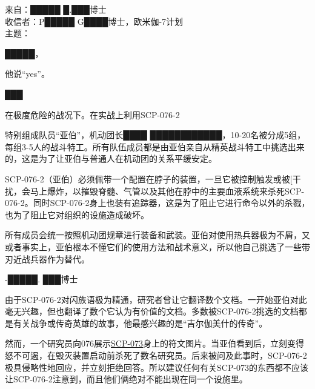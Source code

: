 \hr

\begin{scpbox}

来自：█████ █.███博士\\
收信者：P█████ G████博士，欧米伽-7计划\\
主题：

█████，

他说“yes”。

███

\end{scpbox}

\hr


\begin{scpbox}

在极度危险的战况下。在实战上利用SCP-076-2

特别组成队员“亚伯”，机动团长████ ████████████，10-20名被分成5组，每组3-5人的战斗特工。所有队伍成员都是由亚伯亲自从精英战斗特工中挑选出来的，这是为了让亚伯与普通人在机动团的关系平缓安定。

SCP-076-2（亚伯）必须佩带一个配置在脖子的装置，一旦它被控制触发或被{[}干扰，会马上爆炸，以摧毁脊髓、气管以及其他在脖中的主要血液系统来杀死SCP-076-2。同时SCP-076-2身上也装有追踪器，这是为了阻止它进行命令以外的杀戮，也为了阻止它对组织的设施造成破坏。

所有成员会统一按照机动团规章进行装备和武装。亚伯对使用热兵器极为不屑，又或者事实上，亚伯根本不懂它们的使用方法和战术意义，所以他自己挑选了一些带刃近战兵器作为替代。

-█████. ███博士

\end{scpbox}

\hr


\begin{scpbox}

由于SCP-076-2对闪族语极为精通，研究者曾让它翻译数个文档。一开始亚伯对此毫无兴趣，但也翻译了数个它认为有价值的文档。多数被SCP-076-2挑选的文档都是有关战争或传奇英雄的故事，他最感兴趣的是“吉尔伽美什的传奇”。

然而，一个研究员向076展示\hyperref[chap:SCP-073]{SCP-073}身上的符文图片。当亚伯看到后，立刻变得怒不可遏，在毁灭装置启动前杀死了数名研究员。后来被问及此事时，SCP-076-2极具侵略性地回应，并立刻拒绝回答。所以建议任何有关SCP-073的东西都不应该让SCP-076-2注意到，而且他们俩绝对不能出现在同一个设施里。

\end{scpbox}

